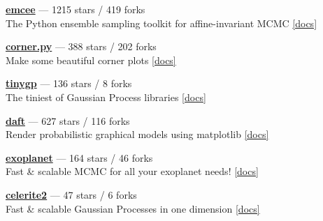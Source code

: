 \item \href{https://github.com/dfm/emcee}{{\bf emcee}} --- 1215 stars / 419 forks \\
The Python ensemble sampling toolkit for affine-invariant MCMC \href{https://emcee.readthedocs.io}{[docs]}

\item \href{https://github.com/dfm/corner.py}{{\bf corner.py}} --- 388 stars / 202 forks \\
Make some beautiful corner plots \href{http://corner.readthedocs.io}{[docs]}

\item \href{https://github.com/dfm/tinygp}{{\bf tinygp}} --- 136 stars / 8 forks \\
The tiniest of Gaussian Process libraries \href{https://tinygp.readthedocs.io}{[docs]}

\item \href{https://github.com/daft-dev/daft}{{\bf daft}} --- 627 stars / 116 forks \\
Render probabilistic graphical models using matplotlib \href{https://docs.daft-pgm.org}{[docs]}

\item \href{https://github.com/exoplanet-dev/exoplanet}{{\bf exoplanet}} --- 164 stars / 46 forks \\
Fast {\&} scalable MCMC for all your exoplanet needs!  \href{https://docs.exoplanet.codes}{[docs]}

\item \href{https://github.com/exoplanet-dev/celerite2}{{\bf celerite2}} --- 47 stars / 6 forks \\
Fast {\&} scalable Gaussian Processes in one dimension \href{https://celerite2.readthedocs.io}{[docs]}